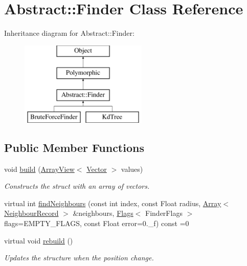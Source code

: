 \hypertarget{classAbstract_1_1Finder}{}\section{Abstract\+:\+:Finder Class Reference}
\label{classAbstract_1_1Finder}
Inheritance diagram for Abstract\+:\+:Finder\+:\begin{figure}[H]
\begin{center}
\leavevmode
\includegraphics[height=4.000000cm]{classAbstract_1_1Finder}
\end{center}
\end{figure}
\subsection*{Public Member Functions}
\begin{DoxyCompactItemize}
\item 
\hypertarget{classAbstract_1_1Finder_a3a5ca4ed2bea8386862d3f3837077e0b}{}\label{classAbstract_1_1Finder_a3a5ca4ed2bea8386862d3f3837077e0b} 
void \hyperlink{classAbstract_1_1Finder_a3a5ca4ed2bea8386862d3f3837077e0b}{build} (\hyperlink{classArrayView}{Array\+View}$<$ \hyperlink{classBasicVector}{Vector} $>$ values)
\begin{DoxyCompactList}\small\item\em Constructs the struct with an array of vectors. \end{DoxyCompactList}\item 
virtual int \hyperlink{classAbstract_1_1Finder_a7f04b92d939992d0aa2978a259b2533f}{find\+Neighbours} (const int index, const Float radius, \hyperlink{classArray}{Array}$<$ \hyperlink{structNeighbourRecord}{Neighbour\+Record} $>$ \&neighbours, \hyperlink{classFlags}{Flags}$<$ Finder\+Flags $>$ flags=E\+M\+P\+T\+Y\+\_\+\+F\+L\+A\+GS, const Float error=0.\+\_\+f) const =0
\item 
\hypertarget{classAbstract_1_1Finder_a011e1092af4b447acd6bc4732e690b32}{}\label{classAbstract_1_1Finder_a011e1092af4b447acd6bc4732e690b32} 
virtual void \hyperlink{classAbstract_1_1Finder_a011e1092af4b447acd6bc4732e690b32}{rebuild} ()
\begin{DoxyCompactList}\small\item\em Updates the structure when the position change. \end{DoxyCompactList}\end{DoxyCompactItemize}
